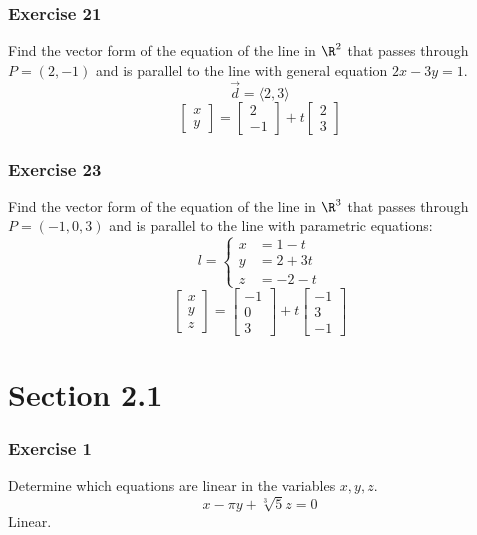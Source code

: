 \documentclass[letterpaper, 12pt]{math}
\begin{document}
\subsubsection*{Exercise 21}
Find the vector form of the equation of the line in \( \R^2 \) that passes
through \( P = (2,-1) \) and is parallel to the line with general equation
\( 2x-3y = 1 \).
\[ \vec{d} = \langle2,3\rangle \]
\[ \begin{bmatrix}x \\ y\end{bmatrix} =
  \begin{bmatrix}2 \\ -1\end{bmatrix}+
  t\begin{bmatrix}2 \\ 3\end{bmatrix} \]

\subsubsection*{Exercise 23}
Find the vector form of the equation of the line in \( \R^3 \) that passes
through \( P = (-1,0,3) \) and is parallel to the line with parametric
equations:
\[ l = \begin{cases}
  x &= 1-t \\
  y &= 2+3t \\
  z &= -2-t
\end{cases} \]
\[ \begin{bmatrix}x \\ y \\ z\end{bmatrix} =
  \begin{bmatrix}-1 \\ 0 \\ 3\end{bmatrix}+
  t\begin{bmatrix}-1 \\ 3 \\ -1\end{bmatrix} \]

\section*{Section 2.1}

\subsubsection*{Exercise 1}
Determine which equations are linear in the variables \( x,y,z \).
\[ x-\pi y+\sqrt[3]{5}z = 0 \]
Linear.
\end{document}
